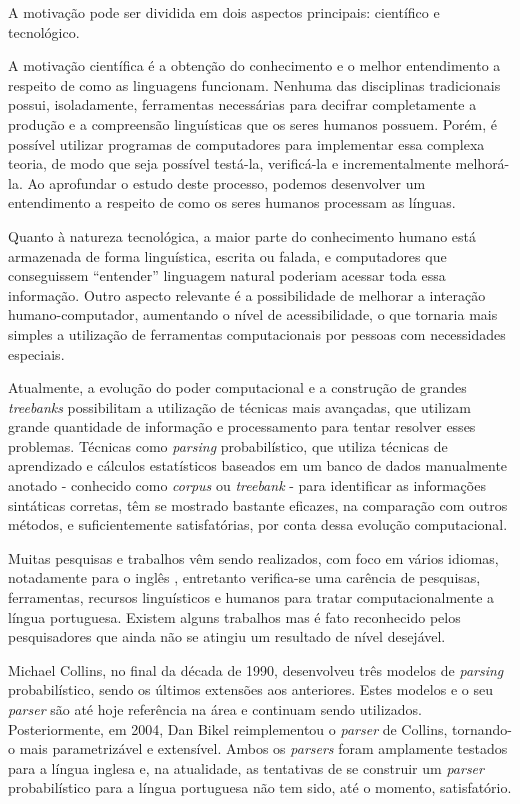 A motivação pode ser dividida em dois aspectos principais: científico e tecnológico.

A motivação científica é a obtenção do conhecimento e o melhor entendimento a respeito de como as linguagens funcionam. Nenhuma das disciplinas tradicionais possui, isoladamente, ferramentas necessárias para decifrar completamente a produção e a compreensão linguísticas que os seres humanos possuem. Porém, é possível utilizar programas de computadores para implementar essa complexa teoria, de modo que seja possível testá-la, verificá-la e incrementalmente melhorá-la. Ao aprofundar o estudo deste processo, podemos desenvolver um entendimento a respeito de como os seres humanos processam as línguas.

Quanto à natureza tecnológica, a maior parte do conhecimento humano está armazenada de forma linguística, escrita ou falada, e computadores que conseguissem ``entender'' linguagem natural poderiam acessar toda essa informação. Outro aspecto relevante é a possibilidade de melhorar a interação humano-computador, aumentando o nível de acessibilidade, o que tornaria mais simples a utilização de ferramentas computacionais por pessoas com necessidades especiais.

Atualmente, a evolução do poder computacional e a construção de grandes \emph{treebanks} possibilitam a utilização de técnicas mais avançadas, que utilizam grande quantidade de informação e processamento para tentar resolver esses problemas. Técnicas como \emph{parsing} probabilístico, que utiliza técnicas de aprendizado e cálculos estatísticos baseados em um banco de dados manualmente anotado - conhecido como \emph{corpus} ou \emph{treebank} - para identificar as informações sintáticas corretas, têm se mostrado bastante eficazes, na comparação com outros métodos, e suficientemente satisfatórias, por conta dessa evolução computacional.

Muitas pesquisas e trabalhos vêm sendo realizados, com foco em vários idiomas, notadamente para o inglês \cite{prolo03,charniak97,collins97}, entretanto verifica-se uma carência de pesquisas, ferramentas, recursos linguísticos e humanos para tratar computacionalmente a língua portuguesa.
Existem alguns trabalhos \cite{baldridge06,bick00,bonfante03} mas é fato reconhecido pelos pesquisadores que ainda não se atingiu um resultado de nível desejável.

Michael Collins, no final da década de 1990, desenvolveu três modelos de \emph{parsing} probabilístico, sendo os últimos extensões aos anteriores. Estes modelos e o seu \emph{parser} são até hoje referência na área e continuam sendo utilizados. Posteriormente, em 2004, Dan Bikel reimplementou o \emph{parser} de Collins, tornando-o mais parametrizável e extensível. Ambos os \emph{parsers} foram amplamente testados para a língua inglesa e, na atualidade, as tentativas de se construir um \emph{parser} probabilístico para a língua portuguesa não tem sido, até o momento, satisfatório.

